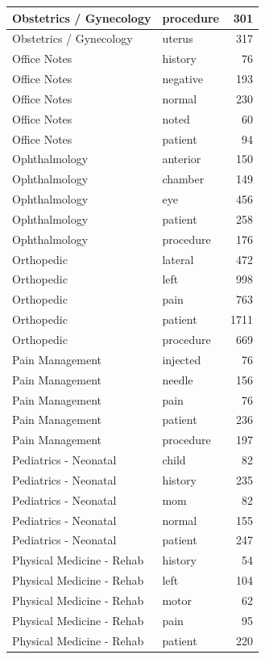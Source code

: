 \documentclass[
]{article}
\begin{document}
\begin{table}
\begin{tabular}{l|l|r}
\hline
Obstetrics / Gynecology & procedure & 301\\
\hline
Obstetrics / Gynecology & uterus & 317\\
\hline
Office Notes & history & 76\\
\hline
Office Notes & negative & 193\\
\hline
Office Notes & normal & 230\\
\hline
Office Notes & noted & 60\\
\hline
Office Notes & patient & 94\\
\hline
Ophthalmology & anterior & 150\\
\hline
Ophthalmology & chamber & 149\\
\hline
Ophthalmology & eye & 456\\
\hline
Ophthalmology & patient & 258\\
\hline
Ophthalmology & procedure & 176\\
\hline
Orthopedic & lateral & 472\\
\hline
Orthopedic & left & 998\\
\hline
Orthopedic & pain & 763\\
\hline
Orthopedic & patient & 1711\\
\hline
Orthopedic & procedure & 669\\
\hline
Pain Management & injected & 76\\
\hline
Pain Management & needle & 156\\
\hline
Pain Management & pain & 76\\
\hline
Pain Management & patient & 236\\
\hline
Pain Management & procedure & 197\\
\hline
Pediatrics - Neonatal & child & 82\\
\hline
Pediatrics - Neonatal & history & 235\\
\hline
Pediatrics - Neonatal & mom & 82\\
\hline
Pediatrics - Neonatal & normal & 155\\
\hline
Pediatrics - Neonatal & patient & 247\\
\hline
Physical Medicine - Rehab & history & 54\\
\hline
Physical Medicine - Rehab & left & 104\\
\hline
Physical Medicine - Rehab & motor & 62\\
\hline
Physical Medicine - Rehab & pain & 95\\
\hline
Physical Medicine - Rehab & patient & 220\\

\end{tabular}
\end{table}
\end{document}
